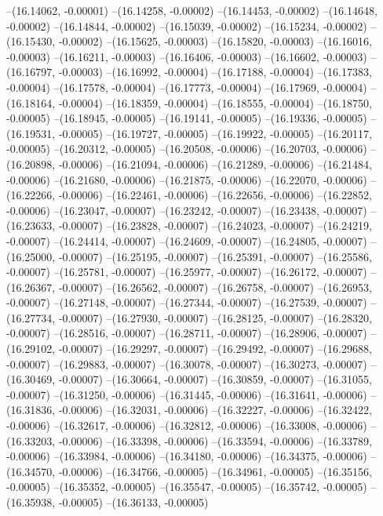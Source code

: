 --(16.14062, -0.00001)
--(16.14258, -0.00002)
--(16.14453, -0.00002)
--(16.14648, -0.00002)
--(16.14844, -0.00002)
--(16.15039, -0.00002)
--(16.15234, -0.00002)
--(16.15430, -0.00002)
--(16.15625, -0.00003)
--(16.15820, -0.00003)
--(16.16016, -0.00003)
--(16.16211, -0.00003)
--(16.16406, -0.00003)
--(16.16602, -0.00003)
--(16.16797, -0.00003)
--(16.16992, -0.00004)
--(16.17188, -0.00004)
--(16.17383, -0.00004)
--(16.17578, -0.00004)
--(16.17773, -0.00004)
--(16.17969, -0.00004)
--(16.18164, -0.00004)
--(16.18359, -0.00004)
--(16.18555, -0.00004)
--(16.18750, -0.00005)
--(16.18945, -0.00005)
--(16.19141, -0.00005)
--(16.19336, -0.00005)
--(16.19531, -0.00005)
--(16.19727, -0.00005)
--(16.19922, -0.00005)
--(16.20117, -0.00005)
--(16.20312, -0.00005)
--(16.20508, -0.00006)
--(16.20703, -0.00006)
--(16.20898, -0.00006)
--(16.21094, -0.00006)
--(16.21289, -0.00006)
--(16.21484, -0.00006)
--(16.21680, -0.00006)
--(16.21875, -0.00006)
--(16.22070, -0.00006)
--(16.22266, -0.00006)
--(16.22461, -0.00006)
--(16.22656, -0.00006)
--(16.22852, -0.00006)
--(16.23047, -0.00007)
--(16.23242, -0.00007)
--(16.23438, -0.00007)
--(16.23633, -0.00007)
--(16.23828, -0.00007)
--(16.24023, -0.00007)
--(16.24219, -0.00007)
--(16.24414, -0.00007)
--(16.24609, -0.00007)
--(16.24805, -0.00007)
--(16.25000, -0.00007)
--(16.25195, -0.00007)
--(16.25391, -0.00007)
--(16.25586, -0.00007)
--(16.25781, -0.00007)
--(16.25977, -0.00007)
--(16.26172, -0.00007)
--(16.26367, -0.00007)
--(16.26562, -0.00007)
--(16.26758, -0.00007)
--(16.26953, -0.00007)
--(16.27148, -0.00007)
--(16.27344, -0.00007)
--(16.27539, -0.00007)
--(16.27734, -0.00007)
--(16.27930, -0.00007)
--(16.28125, -0.00007)
--(16.28320, -0.00007)
--(16.28516, -0.00007)
--(16.28711, -0.00007)
--(16.28906, -0.00007)
--(16.29102, -0.00007)
--(16.29297, -0.00007)
--(16.29492, -0.00007)
--(16.29688, -0.00007)
--(16.29883, -0.00007)
--(16.30078, -0.00007)
--(16.30273, -0.00007)
--(16.30469, -0.00007)
--(16.30664, -0.00007)
--(16.30859, -0.00007)
--(16.31055, -0.00007)
--(16.31250, -0.00006)
--(16.31445, -0.00006)
--(16.31641, -0.00006)
--(16.31836, -0.00006)
--(16.32031, -0.00006)
--(16.32227, -0.00006)
--(16.32422, -0.00006)
--(16.32617, -0.00006)
--(16.32812, -0.00006)
--(16.33008, -0.00006)
--(16.33203, -0.00006)
--(16.33398, -0.00006)
--(16.33594, -0.00006)
--(16.33789, -0.00006)
--(16.33984, -0.00006)
--(16.34180, -0.00006)
--(16.34375, -0.00006)
--(16.34570, -0.00006)
--(16.34766, -0.00005)
--(16.34961, -0.00005)
--(16.35156, -0.00005)
--(16.35352, -0.00005)
--(16.35547, -0.00005)
--(16.35742, -0.00005)
--(16.35938, -0.00005)
--(16.36133, -0.00005)

